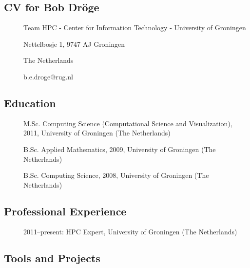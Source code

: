
\subsection{CV for Bob Dr\"oge}
\begin{description}
\item[] Team HPC - Center for Information Technology - University of Groningen
\item[] Nettelbosje 1, 9747 AJ Groningen
\item[] The Netherlands
\item[] b.e.droge@rug.nl
\end{description}

\subsection*{Education}
\begin{description}
\item[] M.Sc. Computing Science (Computational Science and Visualization), 2011, University of Groningen (The Netherlands)
\item[] B.Sc. Applied Mathematics, 2009, University of Groningen (The Netherlands)
\item[] B.Sc. Computing Science, 2008, University of Groningen (The Netherlands)
\end{description}

\subsection*{Professional Experience}
\begin{description}
    \item[] 2011--present: HPC Expert, University of Groningen (The Netherlands)
\end{description}

\subsection*{Tools and Projects}

